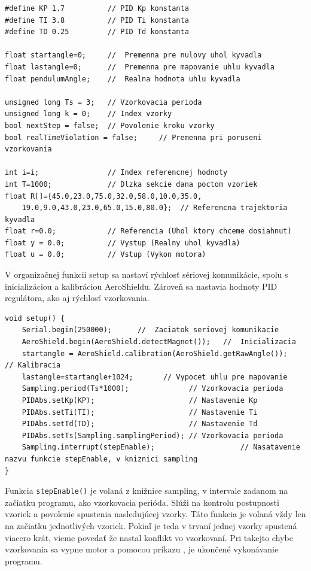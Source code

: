 \begin{lstlisting}[caption={Načítanie knižníc a premenných do programu.},captionpos=b]
#define KP 1.7          // PID Kp konstanta
#define TI 3.8          // PID Ti konstanta
#define TD 0.25         // PID Td konstanta

float startangle=0;     //  Premenna pre nulovy uhol kyvadla
float lastangle=0;      //  Premenna pre mapovanie uhlu kyvadla
float pendulumAngle;    //  Realna hodnota uhlu kyvadla

unsigned long Ts = 3;   // Vzorkovacia perioda 
unsigned long k = 0;    // Index vzorky 
bool nextStep = false;  // Povolenie kroku vzorky 
bool realTimeViolation = false;     // Premenna pri poruseni vzorkovania

int i=i;                // Index referencnej hodnoty 
int T=1000;             // Dlzka sekcie dana poctom vzoriek 
float R[]={45.0,23.0,75.0,32.0,58.0,10.0,35.0,
	19.0,9.0,43.0,23.0,65.0,15.0,80.0};  // Referencna trajektoria kyvadla
float r=0.0;            // Referencia (Uhol ktory chceme dosiahnut)
float y = 0.0;          // Vystup (Realny uhol kyvadla)
float u = 0.0;          // Vstup (Vykon motora)
\end{lstlisting}

V organizačnej funkcii setup sa nastaví rýchlosť sériovej komunikácie, spolu s inicializáciou a kalibráciou AeroShieldu. Zároveň sa nastavia hodnoty PID 
regulátora, ako aj rýchlosť vzorkovania.  

\begin{lstlisting}[caption={Organzačná funkcia setup.},captionpos=b]
void setup() {   
	Serial.begin(250000);      //  Zaciatok seriovej komunikacie
	AeroShield.begin(AeroShield.detectMagnet());   //  Inicializacia 
	startangle = AeroShield.calibration(AeroShield.getRawAngle());        // Kalibracia
	lastangle=startangle+1024;       // Vypocet uhlu pre mapovanie 
	Sampling.period(Ts*1000);              // Vzorkovacia perioda 
	PIDAbs.setKp(KP);                      // Nastavenie Kp
	PIDAbs.setTi(TI);                      // Nastavenie Ti
	PIDAbs.setTd(TD);                      // Nastavenie Td
	PIDAbs.setTs(Sampling.samplingPeriod); // Vzorkovacia perioda
	Sampling.interrupt(stepEnable);  				   // Nasatavenie nazvu funkcie stepEnable, v kniznici sampling 
}
\end{lstlisting}

Funkcia \verb|stepEnable()| je volaná z knižnice sampling, v intervale zadanom na začiatku programu, ako vzorkovacia perióda. Slúži na kontrolu postupnosti vzoriek a povolenie spustenia nasledujúcej vzorky. Táto funkcia je volaná vždy len na začiatku jednotlivých vzoriek. Pokiaľ je teda v trvaní jednej vzorky spustená viacero krát, vieme povedať že nastal konflikt vo vzorkovaní. Pri takejto chybe vzorkovania sa vypne motor a pomocou príkazu , je ukončené vykonávanie programu. 

